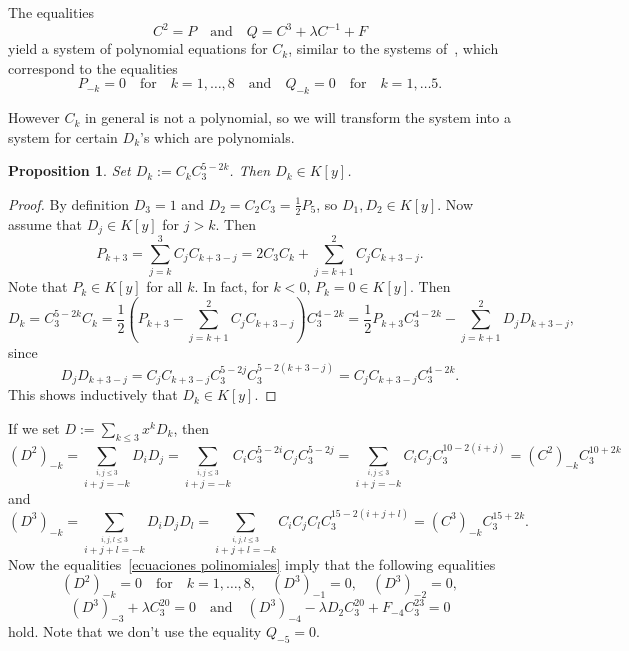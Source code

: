 \documentclass[reqno,a4paper,twoside]{amsart}
\newtheorem{proposition}[theorem]{Proposition}
\theoremstyle{definition}
\theoremstyle{remark}
\begin{document}
The equalities
\begin{equation}\label{ecuaciones basicas}
C^2=P\quad\text{and}\quad Q=C^3+\lambda C^{-1}+F
\end{equation}
 yield a system of polynomial equations for $C_k$, similar to the systems of~\cite{GGV3}, which correspond to
the equalities
\begin{equation}\label{ecuaciones polinomiales}
P_{-k}=0\quad\text{for}\quad k=1,\dots,8\quad\text{and}\quad Q_{-k}=0\quad\text{for}\quad k=1,\dots 5.
\end{equation}

However $C_k$ in general is not a polynomial, so we will transform the system into a system for certain $D_k$'s which are polynomials.


\begin{proposition}
Set $D_k:=C_k C_3^{5-2k}$. Then $D_k\in K[y]$.
\end{proposition}

\begin{proof}
  By definition $D_3=1$ and $D_2=C_2 C_3=\frac 12 P_5$, so $D_1, D_2\in K[y]$.
  Now assume that $D_j\in K[y]$ for $j>k$. Then
  $$
  P_{k+3}=\sum_{j=k}^{3} C_j C_{k+3-j}=2C_3 C_k+\sum_{j=k+1}^{2} C_j C_{k+3-j}.
  $$
  Note that $P_k\in K[y]$ for all $k$. In fact, for $k<0$, $P_k=0\in K[y]$.
  Then
  $$
  D_k=C_3^{5-2k}C_k=\frac 12\left(P_{k+3}-\sum_{j=k+1}^{2} C_j C_{k+3-j} \right)C_3^{4-2k}=\frac 12 P_{k+3}C_3^{4-2k}-\sum_{j=k+1}^{2} D_j D_{k+3-j},
  $$
  since
  $$
  D_j D_{k+3-j}=C_j C_{k+3-j}C_3^{5-2j}C_3^{5-2(k+3-j)}=C_j C_{k+3-j}C_3^{4-2k}.
  $$
  This shows inductively that $D_k\in K[y]$.
\end{proof}

If we set $D:=\sum_{k\le 3} x^k D_k$, then
$$
(D^2)_{-k}=\sum_{\overset{i,j\le 3}{i+j=-k}}D_i D_j=\sum_{\overset{i,j\le 3}{i+j=-k}}C_i C_3^{5-2i}C_jC_3^{5-2j}=\sum_{\overset{i,j\le 3}{i+j=-k}}C_i C_jC_3^{10-2(i+j)}=(C^2)_{-k}C_3^{10+2k}
$$
and
$$
(D^3)_{-k}=\sum_{\overset{i,j,l\le 3}{i+j+l=-k}}D_i D_jD_l=\sum_{\overset{i,j,l\le 3}{i+j+l=-k}}C_i C_jC_lC_3^{15-2(i+j+l)}=(C^3)_{-k}C_3^{15+2k}.
$$
Now the equalities~\eqref{ecuaciones polinomiales} imply that the following equalities
\begin{equation}\label{ecuaciones polinomiales nuevas}
(D^2)_{-k}=0\quad\text{for}\quad k=1,\dots,8,\quad (D^3)_{-1}=0,\quad (D^3)_{-2}=0,
\end{equation}
$$
(D^3)_{-3}+\lambda C_3^{20}=0\quad\text{and}\quad  (D^3)_{-4}-\lambda D_2 C_3^{20}+F_{-4}C_3^{23}=0
$$
hold. Note that we don't use the equality $Q_{-5}=0$.
\end{document}
